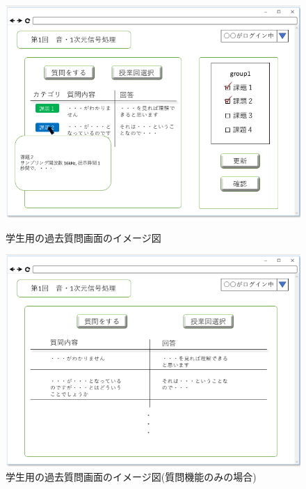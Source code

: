 \begin{figure}[htbp]
 \begin{minipage}{0.5\hsize}
  \begin{center}
   \includegraphics[width=1\linewidth,clip]{./img/34.png}
  \end{center}
  \caption{学生用の過去質問画面のイメージ図　　　　　　　　　　}\label{fig:34}
 \end{minipage}
 \begin{minipage}{0.5\hsize}
  \begin{center}
   \includegraphics[width=1\linewidth,clip]{./img/35.png}
  \end{center}
  \caption{学生用の過去質問画面のイメージ図(質問機能のみの場合)}\label{fig:35}
 \end{minipage}
\end{figure}

